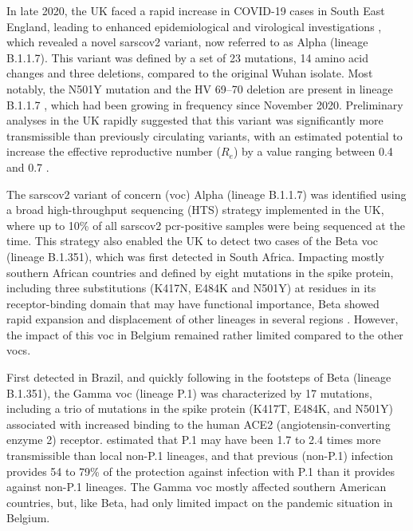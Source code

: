 In late 2020, the UK faced a rapid increase in COVID-19 cases in South East England, leading to enhanced epidemiological and virological investigations \citep{cogUKreport1}, which revealed a novel \gls{sarscov2} variant, now referred to as Alpha (lineage B.1.1.7).
This variant was defined by a set of 23 mutations, 14 amino acid changes and three deletions, compared to the original Wuhan isolate.
Most notably, the N501Y mutation and the HV 69--70 deletion are present in lineage B.1.1.7 \citep{rambaut2020dynamic}, which had been growing in frequency since November 2020.
Preliminary analyses in the UK rapidly suggested that this variant was significantly more transmissible than previously circulating variants, with an estimated potential to increase the effective reproductive number ($R_e$) by a value ranging between 0.4 and 0.7 \citep{volz2021assessing}.

The \gls{sarscov2} variant of concern (\gls{voc}) Alpha (lineage B.1.1.7) was identified using a broad high-throughput sequencing (HTS) strategy implemented in the UK, where up to 10\% of all \gls{sarscov2} \gls{pcr}-positive samples were being sequenced at the time.
This strategy also enabled the UK to detect two cases of the Beta \gls{voc} (lineage B.1.351), which was first detected in South Africa.
Impacting mostly southern African countries and defined by eight mutations in the spike protein, including three substitutions (K417N, E484K and N501Y) at residues in its receptor-binding domain that may have functional importance, Beta showed rapid expansion and displacement of other lineages in several regions \citep{tegally2021detection}.
However, the impact of this \gls{voc} in Belgium remained rather limited compared to the other \gls{voc}s.

First detected in Brazil, and quickly following in the footsteps of Beta (lineage B.1.351), the Gamma \gls{voc} (lineage P.1) was characterized by 17 mutations, including a trio of mutations in the spike protein (K417T, E484K, and N501Y) associated with increased binding to the human ACE2 (angiotensin-converting enzyme 2) receptor.
\citet{faria2021genomics} estimated that P.1 may have been 1.7 to 2.4 times more transmissible than local non-P.1 lineages, and that previous (non-P.1) infection provides 54 to 79\% of the protection against infection with P.1 than it provides against non-P.1 lineages.
The Gamma \gls{voc} mostly affected southern American countries, but, like Beta, had only limited impact on the pandemic situation in Belgium.

